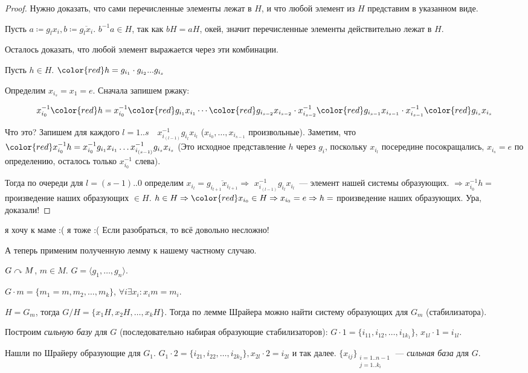 \begin{proof}
    Нужно доказать, что сами перечисленные элементы лежат в $H$, и что любой элемент из $H$ представим в указанном виде.

    Пусть $a \coloneqq g_lx_i, b \coloneqq \overline{g_lx_i}$.  $b^{-1}a \in H$, так как  $bH=aH$, окей, значит перечисленные элементы действительно лежат в $H$.

    Осталось доказать, что любой элемент выражается через эти комбинации.

    Пусть  $h \in H$. ${\color{red}h} = g_{i_1} \cdot g_{i_2} ... g_{i_s}$

    Определим $x_{i_s} = x_1 = e$. Сначала запишем ржаку:

    {
\large
$$
x_{i_0}^{-1} {\color{red}h} = x_{i_0}^{-1} {\color{red}g_{i_1}} x_{i_1} \cdots {\color{red}g_{i_{s-2}}} x_{i_{s-2}} \cdot x_{i_{s-2}}^{-1} {\color{red} g_{i_{s-1}}} x_{i_{s-1}} \cdot x_{i_{s-1}}^{-1} {\color{red}g_{i_{s}}} x_{i_s}
$$
    }

    Что это? Запишем для каждого $l=1..s \quad x_{i_{(l-1)}}^{-1}g_{i_l}x_{i_l}$ ($x_{i_0}, \ldots, x_{i_{s-1}}$ произвольные). Заметим, что  ${\color{red}x_{i_0}^{-1}h} = x_{i_0}^{-1}g_{i_1} x_{i_1} \ldots x_{i_{(s - 1)}}^{-1} g_{i_s} x_{i_s}$ (Это исходное представление $h$ через $g_i$, поскольку $x_{i_l}$ посередине посокращались, $x_{i_s} = e$ по определению, осталось только $x_{i_0}^{-1}$ слева).

    Тогда по очереди для $l=(s\!-\!1)..0$ определим $x_{i_l} = \overline{g_{i_{l+1}} x_{i_{l+1}}} \Rightarrow$ {\color{blue}$x_{i_{(l-1)}}^{-1}g_{i_{l}} x_{i_{l}}$}~--- элемент нашей системы образующих.
    $\Rightarrow x_{i_0}^{-1}h = $ произведение наших образующих $\in H$.
    $h \in H \Rightarrow {\color{red}x_{i_0} \in H} \Rightarrow x_{i_0} = e \Rightarrow h = $ произведение наших образующих. Ура, доказали!
\end{proof}

я хочу к маме :( я тоже :( Если разобраться, то всё довольно несложно!

А теперь применим полученную лемму к нашему частному случаю.

\begin{exerc}
    $G \curvearrowright M$,  $m \in M$.  $G = \langle g_1, \ldots, g_n\rangle$.

    $G \cdot m = \{ m_1=m,  m_2, \ldots, m_k\}$, $\forall i \exists x_i\!: x_im = m_i$.

     $H = G_m$, тогда  $G / H = \{x_1H, x_2H, \ldots, x_k H\}$. Тогда по лемме Шрайера можно найти систему образующих для $G_m$ (стабилизатора).

     Построим \textit{сильную базу} для $G$ (последовательно набирая образующие стабилизаторов):  $G \cdot 1 = \{i_{11}, i_{12}, \ldots, i_{1k_1}\}$, $x_{1l} \cdot 1 = i_{1l}$.

     Нашли по Шрайеру образующие для  $G_1$. $G_1 \cdot 2 = \{ i_{21}, i_{22}, \ldots, i_{2k_2}\}, x_{2l} \cdot 2 = i_{2l}$ и так далее. $\{x_{ij}\}_{\substack{i=1..n-1\\j=1..k_i}}$ --- \textit{сильная база} для  $G$.
\end{exerc}

